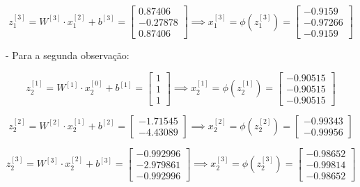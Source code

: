 \documentclass[a4paper,12pt]{article} %
\begin{document}
\begin{enumerate}
\begin{equation*}
    z^{[3]}_1 = W^{[3]} \cdot x^{[2]}_1 + b^{[3]} = \begin{bmatrix} 0.87406 \\ -0.27878 \\ 0.87406 \end{bmatrix} \implies x^{[3]}_1 = \phi(z^{[3]}_1)= \begin{bmatrix} -0.9159 \\ -0.97266 \\ -0.9159 \end{bmatrix}
\end{equation*}

- Para a segunda observação:

\begin{equation*}
    z^{[1]}_2 = W^{[1]} \cdot x^{[0]}_2 + b^{[1]} = \begin{bmatrix} 1 \\ 1 \\ 1 \end{bmatrix} \implies x^{[1]}_2 = \phi(z^{[1]}_2)= \begin{bmatrix} -0.90515 \\ -0.90515 \\ -0.90515 \end{bmatrix}
\end{equation*}

\begin{equation*}
    z^{[2]}_2 = W^{[2]} \cdot x^{[1]}_2 + b^{[2]} = \begin{bmatrix} -1.71545 \\ -4.43089 \end{bmatrix} \implies x^{[2]}_2 = \phi(z^{[2]}_2)= \begin{bmatrix} -0.99343 \\ -0.99956 \end{bmatrix}
\end{equation*}

\begin{equation*}
    z^{[3]}_2 = W^{[3]} \cdot x^{[2]}_2 + b^{[3]} = \begin{bmatrix} -0.992996 \\ -2.979861 \\ -0.992996 \end{bmatrix} \implies x^{[3]}_2 = \phi(z^{[3]}_2)= \begin{bmatrix} -0.98652 \\ -0.99814\\ -0.98652 \end{bmatrix}
\end{equation*}


\end{enumerate}
\end{document}
